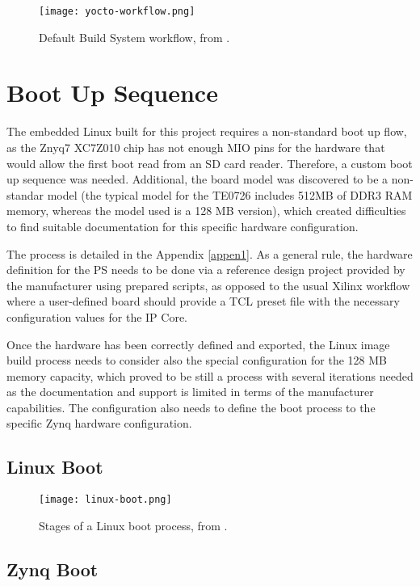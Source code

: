 \begin{figure}[htp]
	\centering
	\texttt{[image: yocto-workflow.png]}
	\caption{Default Build System workflow, from \cite{yocto-manual}.} \label{fig:yocto-workflow}
\end{figure}

\section{Boot Up Sequence}

The embedded Linux built for this project requires a non-standard boot up flow, as the Znyq7 XC7Z010
chip has not enough MIO pins for the hardware that would allow the first boot read from an SD card
reader. Therefore, a custom boot up sequence was needed. Additional, the board model was discovered
to be a non-standar model (the typical model for the TE0726 includes 512MB of DDR3 RAM memory,
whereas the model used is a 128 MB version), which created difficulties to find suitable
documentation for this specific hardware configuration.

The process is detailed in the Appendix \ref{appen1}. As a general rule, the hardware definition for
the PS needs to be done via a reference design project provided by the manufacturer using prepared
scripts, as opposed to the usual Xilinx workflow where a user-defined board should provide a TCL
preset file with the necessary configuration values for the IP Core.

Once the hardware has been correctly defined and exported, the Linux image build process needs to
consider also the special configuration for the 128 MB memory capacity, which proved to be still a
process with several iterations needed as the documentation and support is limited in terms of the
manufacturer capabilities. The configuration also needs to define the boot process to the specific
Zynq hardware configuration.

\subsection{Linux Boot}

\begin{figure}[htp]
	\centering
	\texttt{[image: linux-boot.png]}
	\caption{Stages of a Linux boot process, from \cite{Crokett2014}.} \label{fig:linux-boot}
\end{figure}

\subsection{Zynq Boot}

